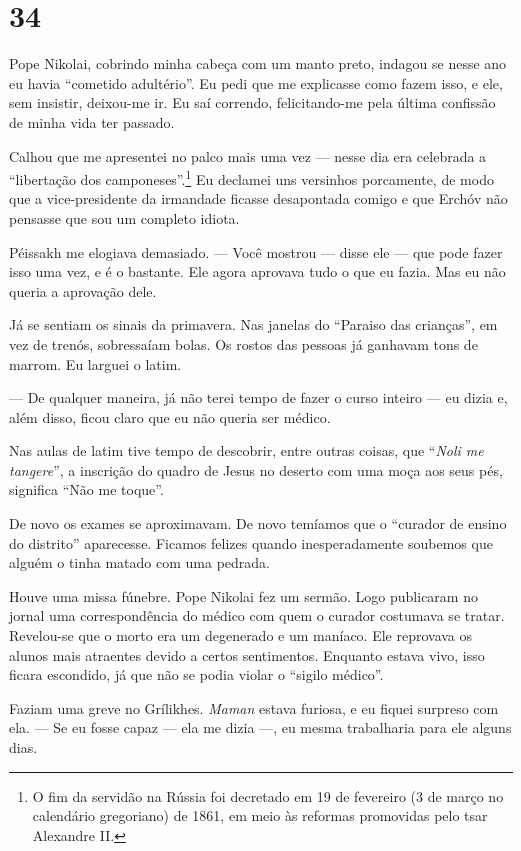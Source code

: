 \section{34}

Pope Nikolai, cobrindo minha cabeça com um manto preto, indagou se nesse
ano eu havia ``cometido adultério''. Eu pedi que me explicasse como
fazem isso, e ele, sem insistir, deixou-me ir. Eu saí correndo,
felicitando-me pela última confissão de minha vida ter passado.

Calhou que me apresentei no palco mais uma vez --- nesse dia era
celebrada a ``libertação dos camponeses''.\footnote{O fim da servidão na
  Rússia foi decretado em 19 de fevereiro (3 de março no calendário
  gregoriano) de 1861, em meio às reformas promovidas pelo tsar
  Alexandre II.} Eu declamei uns versinhos porcamente, de modo que a
vice-presidente da irmandade ficasse desapontada comigo e que Erchóv não
pensasse que sou um completo idiota.

Péissakh me elogiava demasiado. --- Você mostrou --- disse ele --- que
pode fazer isso uma vez, e é o bastante. Ele agora aprovava tudo o que
eu fazia. Mas eu não queria a aprovação dele.

Já se sentiam os sinais da primavera. Nas janelas do ``Paraiso das
crianças'', em vez de trenós, sobressaíam bolas. Os rostos das pessoas
já ganhavam tons de marrom. Eu larguei o latim.

--- De qualquer maneira, já não terei tempo de fazer o curso inteiro ---
eu dizia e, além disso, ficou claro que eu não queria ser médico.

Nas aulas de latim tive tempo de descobrir, entre outras coisas, que
``\emph{Noli me tangere}'', a inscrição do quadro de Jesus no deserto
com uma moça aos seus pés, significa ``Não me toque''.

De novo os exames se aproximavam. De novo temíamos que o ``curador de
ensino do distrito'' aparecesse. Ficamos felizes quando inesperadamente
soubemos que alguém o tinha matado com uma pedrada.

Houve uma missa fúnebre. Pope Nikolai fez um sermão. Logo publicaram no
jornal uma correspondência do médico com quem o curador costumava se
tratar. Revelou-se que o morto era um degenerado e um maníaco. Ele
reprovava os alunos mais atraentes devido a certos sentimentos. Enquanto
estava vivo, isso ficara escondido, já que não se podia violar o
``sigilo médico''.

Faziam uma greve no Grílikhes. \emph{Maman} estava furiosa, e eu fiquei
surpreso com ela. --- Se eu fosse capaz --- ela me dizia ---, eu mesma
trabalharia para ele alguns dias.

